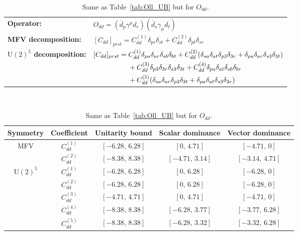 \begin{table}[tbp]
\centering
{\small
\begin{tabular}{ll}
    \textbf{Operator:} &
        $\boxed{O_{dd} = (\overline d_p \gamma^\mu d_r)(\overline d_s \gamma_\mu d_t)}$ \\[0.2cm]
    \textbf{MFV decomposition:} &
        $[C_{dd}]_{prst} =
            C_{dd}^{(1)}\delta_{pr}\delta_{st}
            + C_{dd}^{(2)}\delta_{pt}\delta_{sr}
            $ \\[0.15cm]
    \textbf{$\mathrm{U}(2)^5$ decomposition:} &
        $[C_{dd}]_{prst} =
            C_{dd}^{(1)}\Pij{p}{r}{a}\Pij{s}{t}{b}
            + C_{dd}^{(2)}(\Pij{s}{t}{a}\delta_{p3}\delta_{3r} + \Pij{p}{r}{a}\delta_{s3}\delta_{3t})
            $ \\
        & $\phantom{[C_{dd}]_{prst} ={}}+ C_{dd}^{(3)}\delta_{p3}\delta_{3r}\delta_{s3}\delta_{3t}
            + C_{dd}^{(4)}\Pij{p}{t}{a}\Pij{s}{r}{b}
            $ \\
        & $\phantom{[C_{dd}]_{prst} ={}}+ C_{dd}^{(5)}(\Pij{s}{r}{a}\delta_{p3}\delta_{3t} + \Pij{p}{t}{a}\delta_{s3}\delta_{3r})$ \\
\end{tabular}
\\[0.3cm]
\renewcommand{\arraystretch}{1.3}
\begin{tabular}{ccccc}
    \toprule
    \rowcolor{hdrcolor}
    \textbf{Symmetry} & \textbf{Coefficient}
        & \textbf{Unitarity bound}
        & \textbf{Scalar dominance}
        & \textbf{Vector dominance} \\
    \midrule
    \multirow{2}{*}{MFV}
        & $C_{dd}^{(1)}$ & $[-6.28,\, 6.28]$  & $[0,\, 4.71]$      & $[-4.71,\, 0]$    \\
        & $C_{dd}^{(2)}$ & $[-8.38,\, 8.38]$  & $[-4.71,\, 3.14]$  & $[-3.14,\, 4.71]$ \\
    \midrule
    \multirow{5}{*}{$\mathrm{U}(2)^5$}
        & $C_{dd}^{(1)}$ & $[-6.28,\, 6.28]$ & $[0,\, 6.28]$      & $[-6.28,\, 0]$    \\
        & $C_{dd}^{(2)}$ & $[-6.28,\, 6.28]$ & $[0,\, 6.28]$      & $[-6.28,\, 0]$    \\
        & $C_{dd}^{(3)}$ & $[-4.71,\, 4.71]$ & $[0,\, 4.71]$      & $[-4.71,\, 0]$    \\
        & $C_{dd}^{(4)}$ & $[-8.38,\, 8.38]$ & $[-6.28,\, 3.77]$  & $[-3.77,\, 6.28]$ \\
        & $C_{dd}^{(5)}$ & $[-8.38,\, 8.38]$ & $[-6.28,\, 3.32]$  & $[-3.32,\, 6.28]$ \\
    \bottomrule
\end{tabular}}
\caption{Same as Table~\ref{tab:Oll_UB} but for $O_{dd}$.}
\label{tab:Odd_UB}
\end{table}

